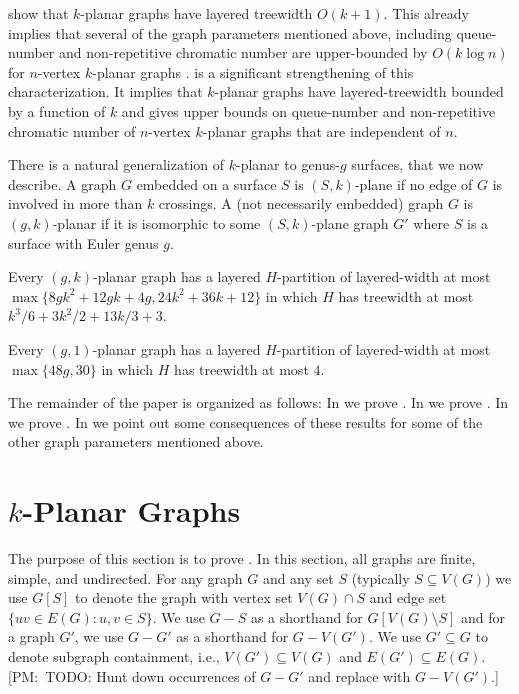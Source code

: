 \documentclass{patmorin}
\newcommand{\note}[2]{{\color{red}[#1:~#2]}}
\newcommand{\treewidth}{\ensuremath{k^3/6 + 3k^2/2 + 13k/3 + 3}}
\begin{document}
\citet{dujmovic.eppstein.ea:structure} show that $k$-planar graphs have layered treewidth $O(k+1)$.  This already implies that several of the graph parameters mentioned above, including queue-number and non-repetitive chromatic number are upper-bounded by $O(k\log n)$ for $n$-vertex $k$-planar graphs \cite{dujmovic.morin.ea:layered}.  is a significant strengthening of this characterization. It implies that $k$-planar graphs have layered-treewidth bounded by a function of $k$ and gives upper bounds on queue-number and non-repetitive chromatic number of $n$-vertex $k$-planar graphs that are independent of $n$.

There is a natural generalization of $k$-planar to genus-$g$ surfaces, that we now describe.  A graph $G$ embedded on a surface $S$ is $(S,k)$-plane if no edge of $G$ is involved in more than $k$ crossings.  A (not necessarily embedded) graph $G$ is $(g,k)$-planar if it is isomorphic to some $(S,k)$-plane graph $G'$ where $S$ is a surface with Euler genus $g$.

\begin{thm}
  Every $(g,k)$-planar graph has a layered $H$-partition of layered-width at most $\max\{8gk^2 + 12gk + 4g, 24k^2 + 36k + 12\}$ in which $H$ has treewidth at most $\treewidth$.
  
  Every $(g,1)$-planar graph has a layered $H$-partition of layered-width at most $\max\{48g, 30\}$ in which $H$ has treewidth at most $4$.  
\end{thm}

The remainder of the paper is organized as follows: In  we prove .  In  we prove .  
In  we prove . In  we point out some consequences of these results for some of the other graph parameters mentioned above.


\section{$k$-Planar Graphs}

The purpose of this section is to prove .  In this section, all graphs are finite, simple, and undirected.  For any graph $G$ and any set $S$ (typically $S\subseteq V(G)$) we use $G[S]$ to denote the graph with vertex set $V(G)\cap S$ and edge set $\{uv\in E(G) : u,v\in S\}$.  We use $G-S$ as a shorthand for $G[V(G)\setminus S]$ and for a graph $G'$, we use $G-G'$ as a shorthand for $G-V(G')$.  We use $G'\subseteq G$ to denote subgraph containment, i.e., $V(G')\subseteq V(G)$ and $E(G')\subseteq E(G)$. \note{PM}{TODO: Hunt down occurrences of $G-G'$ and replace with $G-V(G')$.}
\end{document}
